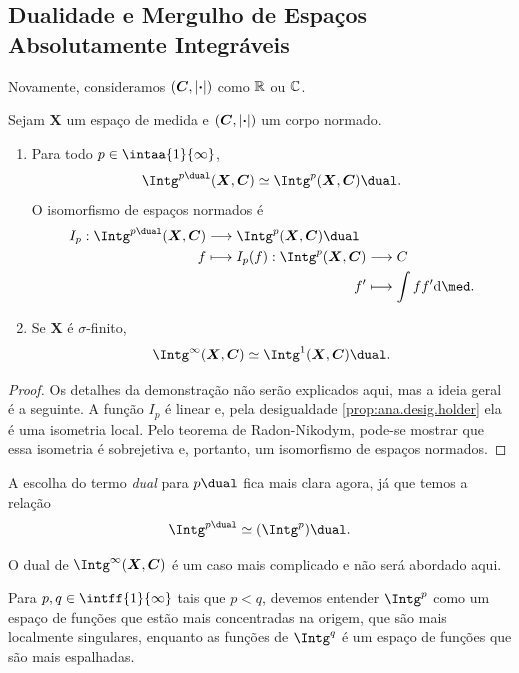 \subsection{Dualidade e Mergulho de Espaços Absolutamente Integráveis}

Novamente, consideramos $(\bm C,\left\vert{\bm{\cdot}}\right\vert)$ como $\mathbb{R}$ ou $\mathbb{C}$.

\begin{prop}
Sejam $\bm X$ um espaço de medida e $(\bm C,\left\vert{\bm{\cdot}}\right\vert)$ um corpo normado.
	\begin{enumerate}
	\item Para todo $p \in \intaa{1}{\infty}$, 
		\begin{equation*}
		\Intg^{p\dual}(\bm X,\bm C) \simeq \Intg^p(\bm X,\bm C)\dual.
		\end{equation*}
O isomorfismo de espaços normados é
		\begin{align*}
		\func{I_p}{\Intg^{p\dual}(\bm X,\bm C)}{\Intg^p(\bm X,\bm C)\dual}{f}{
			\begin{aligned}[t]
			\func{I_p(f)}{\Intg^p(\bm X,\bm C)}{C}{f'}{\int ff' \dd\med}.
			\end{aligned}
		}
		\end{align*}
	
	\item Se $\bm X$ é $\sigma$-finito,
		\begin{equation*}
		\Intg^\infty(\bm X,\bm C) \simeq \Intg^1(\bm X,\bm C)\dual.
		\end{equation*}	
	\end{enumerate}
\end{prop}
\begin{proof}
Os detalhes da demonstração não serão explicados aqui, mas a ideia geral é a seguinte. A função $I_p$ é linear e, pela desigualdade \ref{prop:ana.desig.holder} ela é uma isometria local. Pelo teorema de Radon-Nikodym, pode-se mostrar que essa isometria é sobrejetiva e, portanto, um isomorfismo de espaços normados.
\end{proof}

A escolha do termo \textit{dual} para $p\dual$ fica mais clara agora, já que temos a relação
	\begin{equation*}
	\Intg^{p\dual} \simeq (\Intg^p)\dual.
	\end{equation*}

O dual de $\Intg^\infty(\bm X,\bm C)$ é um caso mais complicado e não será abordado aqui.

Para $p,q \in \intff{1}{\infty}$ tais que $p < q$, devemos entender $\Intg^p$ como um espaço de funções que estão mais concentradas na origem, que são mais localmente singulares, enquanto as funções de $\Intg^q$ é um espaço de funções que são mais espalhadas.

